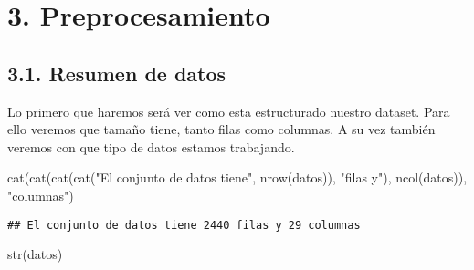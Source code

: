 \documentclass[
]{article}
\newenvironment{Shaded}{\begin{snugshade}}{\end{snugshade}}
\newcommand{\FunctionTok}[1]{\textcolor[rgb]{0.00,0.00,0.00}{#1}}
\newcommand{\NormalTok}[1]{#1}
\newcommand{\StringTok}[1]{\textcolor[rgb]{0.31,0.60,0.02}{#1}}
\begin{document}
\newpage

\hypertarget{preprocesamiento}{%
\section{3. Preprocesamiento}\label{preprocesamiento}}

\hypertarget{resumen-de-datos}{%
\subsection{3.1. Resumen de datos}\label{resumen-de-datos}}

Lo primero que haremos será ver como esta estructurado nuestro dataset.
Para ello veremos que tamaño tiene, tanto filas como columnas. A su vez
también veremos con que tipo de datos estamos trabajando.

\begin{Shaded}
\begin{Highlighting}[]
\FunctionTok{cat}\NormalTok{(}\FunctionTok{cat}\NormalTok{(}\FunctionTok{cat}\NormalTok{(}\FunctionTok{cat}\NormalTok{(}\StringTok{"El conjunto de datos tiene"}\NormalTok{, }\FunctionTok{nrow}\NormalTok{(datos)), }\StringTok{"filas y"}\NormalTok{), }
        \FunctionTok{ncol}\NormalTok{(datos)), }\StringTok{"columnas"}\NormalTok{)}
\end{Highlighting}
\end{Shaded}

\begin{verbatim}
## El conjunto de datos tiene 2440 filas y 29 columnas
\end{verbatim}

\begin{Shaded}
\begin{Highlighting}[]
\FunctionTok{str}\NormalTok{(datos)}
\end{Highlighting}
\end{Shaded}
\end{document}
